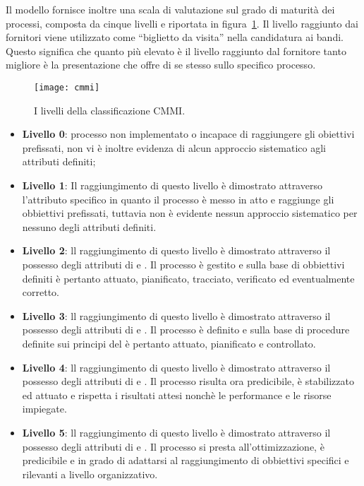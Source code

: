 Il modello fornisce inoltre una scala di valutazione sul grado di maturità dei processi, composta da cinque livelli e riportata in figura~\ref{fig:cmmi}. Il livello raggiunto dai fornitori viene utilizzato come ``biglietto da visita'' nella candidatura ai bandi. Questo significa che quanto più elevato è il livello raggiunto dal fornitore tanto migliore è la presentazione che offre di se stesso sullo specifico processo.

\begin{figure}[h]
\centering
\texttt{[image: cmmi]}
\caption{I livelli della classificazione CMMI.}\label{fig:cmmi}
\end{figure}

\begin{itemize}
\item \textbf{Livello 0}: processo non implementato o incapace di raggiungere gli obiettivi prefissati, non vi è inoltre evidenza di alcun approccio sistematico agli attributi definiti;

\item \textbf{Livello 1}: Il raggiungimento di questo livello è dimostrato attraverso l'attributo specifico  in quanto il processo è messo in atto e raggiunge gli obbiettivi prefissati, tuttavia non è evidente nessun approccio sistematico per nessuno degli attributi definiti. 

\item \textbf{Livello 2}: ll raggiungimento di questo livello è dimostrato attraverso il possesso degli attributi di  e . Il processo è gestito e sulla base di obbiettivi definiti è pertanto attuato, pianificato, tracciato, verificato ed eventualmente corretto.

\item \textbf{Livello 3}: ll raggiungimento di questo livello è dimostrato attraverso il possesso degli attributi di  e . Il processo è definito e sulla base di procedure definite sui principi del  è pertanto attuato, pianificato e controllato.

\item \textbf{Livello 4}: ll raggiungimento di questo livello è dimostrato attraverso il possesso degli attributi di  e . Il processo risulta ora predicibile, è stabilizzato ed attuato e rispetta i risultati attesi nonchè le performance e le risorse impiegate.

\item\textbf{Livello 5}: ll raggiungimento di questo livello è dimostrato attraverso il possesso degli attributi di  e . Il processo si presta all'ottimizzazione, è predicibile e in grado di adattarsi al raggiungimento di obbiettivi specifici e rilevanti a livello organizzativo.
\end{itemize}
\clearpage

